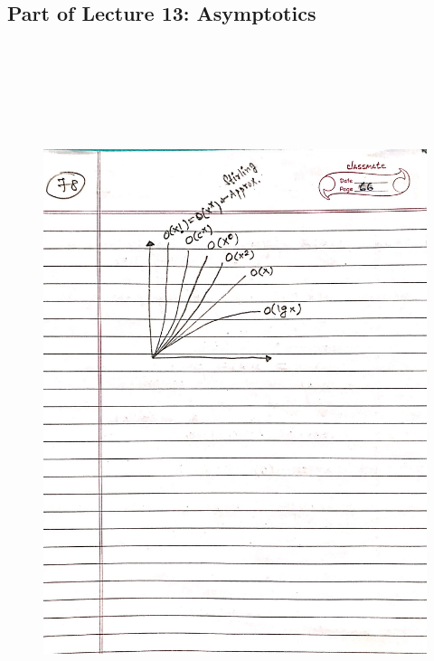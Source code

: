 \newpage
{\color{black} \subsection*{Part of Lecture 13: Asymptotics}}
\begin{figure}[H]
    \centering
    \includegraphics[width=16cm, height=21cm]{"./MIT-6.042J/MIT-6042J-078"}
\end{figure}
